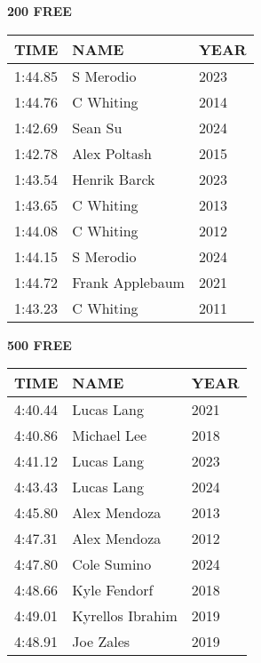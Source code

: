 \vspace{0.4cm}

\begin{minipage}[t]{0.48\textwidth}
\centering
\textbf{200 FREE}\\[0.05cm]
\begin{tabular}{@{}p{1.8cm}p{2.8cm}p{1.2cm}@{}}
\hline
\textbf{TIME} & \textbf{NAME} & \textbf{YEAR} \\
\hline
1:44.85 & S Merodio & 2023 \\
1:44.76 & C Whiting & 2014 \\
1:42.69 & Sean Su & 2024 \\
1:42.78 & Alex Poltash & 2015 \\
1:43.54 & Henrik Barck & 2023 \\
1:43.65 & C Whiting & 2013 \\
1:44.08 & C Whiting & 2012 \\
1:44.15 & S Merodio & 2024 \\
1:44.72 & Frank Applebaum & 2021 \\
1:43.23 & C Whiting & 2011 \\
\hline
\end{tabular}
\end{minipage}\hfill
\begin{minipage}[t]{0.48\textwidth}
\centering
\textbf{500 FREE}\\[0.05cm]
\begin{tabular}{@{}p{1.8cm}p{2.8cm}p{1.2cm}@{}}
\hline
\textbf{TIME} & \textbf{NAME} & \textbf{YEAR} \\
\hline
4:40.44 & Lucas Lang & 2021 \\
4:40.86 & Michael Lee & 2018 \\
4:41.12 & Lucas Lang & 2023 \\
4:43.43 & Lucas Lang & 2024 \\
4:45.80 & Alex Mendoza & 2013 \\
4:47.31 & Alex Mendoza & 2012 \\
4:47.80 & Cole Sumino & 2024 \\
4:48.66 & Kyle Fendorf & 2018 \\
4:49.01 & Kyrellos Ibrahim & 2019 \\
4:48.91 & Joe Zales & 2019 \\
\hline
\end{tabular}
\end{minipage}

\vspace{0.4cm}

